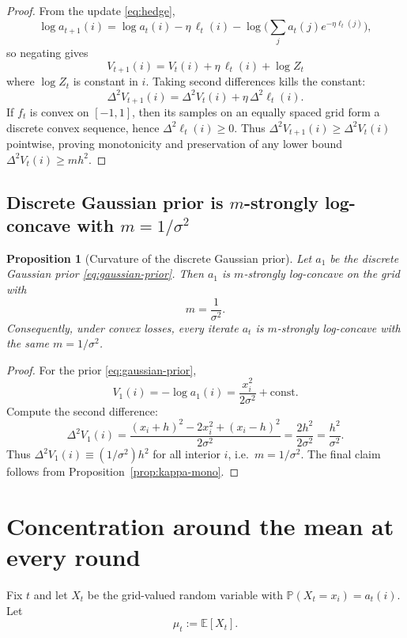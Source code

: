 \documentclass[11pt]{article}
\newtheorem{proposition}{Proposition}
\begin{document}
\begin{proof}
    From the update \eqref{eq:hedge},
    \[
        \log a_{t+1}(i)=\log a_t(i)-\eta\,\ell_t(i)-\log\Big(\sum_j a_t(j)e^{-\eta\ell_t(j)}\Big),
    \]
    so negating gives
    \[
        V_{t+1}(i)=V_t(i)+\eta\,\ell_t(i)+\log Z_t
    \]
    where $\log Z_t$ is constant in $i$. Taking second differences kills the constant:
    \[
        \Delta^2 V_{t+1}(i)=\Delta^2 V_t(i)+\eta\,\Delta^2 \ell_t(i).
    \]
    If $f_t$ is convex on $[-1,1]$, then its samples on an equally spaced grid form a discrete convex sequence, hence $\Delta^2 \ell_t(i)\ge 0$.
    Thus $\Delta^2 V_{t+1}(i)\ge \Delta^2 V_t(i)$ pointwise, proving monotonicity and preservation of any lower bound $\Delta^2 V_t(i)\ge m h^2$.
\end{proof}

\subsection{Discrete Gaussian prior is $m$-strongly log-concave with $m=1/\sigma^2$}

\begin{proposition}[Curvature of the discrete Gaussian prior]\label{prop:gauss-curv}
    Let $a_1$ be the discrete Gaussian prior \eqref{eq:gaussian-prior}. Then $a_1$ is $m$-strongly log-concave on the grid with
    \[
        m=\frac{1}{\sigma^2}.
    \]
    Consequently, under convex losses, every iterate $a_t$ is $m$-strongly log-concave with the same $m=1/\sigma^2$.
\end{proposition}

\begin{proof}
    For the prior \eqref{eq:gaussian-prior},
    \[
        V_1(i)=-\log a_1(i)=\frac{x_i^2}{2\sigma^2}+\text{const}.
    \]
    Compute the second difference:
    \[
        \Delta^2 V_1(i)
        = \frac{(x_i+h)^2 - 2x_i^2 + (x_i-h)^2}{2\sigma^2}
        = \frac{2h^2}{2\sigma^2}
        = \frac{h^2}{\sigma^2}.
    \]
    Thus $\Delta^2 V_1(i)\equiv (1/\sigma^2)h^2$ for all interior $i$, i.e.\ $m=1/\sigma^2$.
    The final claim follows from Proposition~\ref{prop:kappa-mono}.
\end{proof}

\section{Concentration around the mean at every round}

Fix $t$ and let $X_t$ be the grid-valued random variable with $\mathbb{P}(X_t=x_i)=a_t(i)$.
Let
\[
    \mu_t := \mathbb{E}[X_t].
\]
\end{document}
